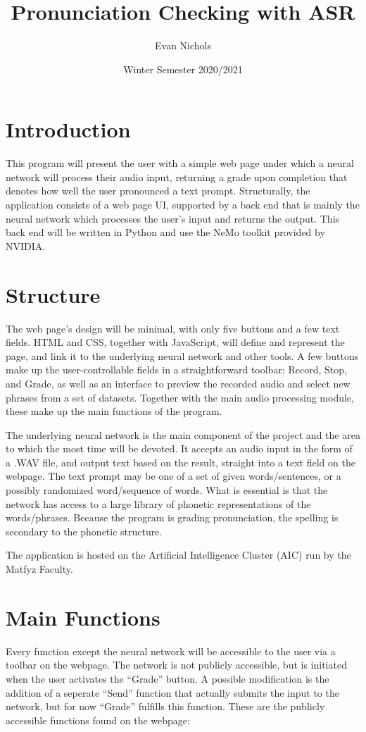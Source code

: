 \documentclass[12pt, letterpaper]{article}
\title{Pronunciation Checking with ASR}
\author{Evan Nichols}
\date{Winter Semester 2020/2021}
\begin{document}
\maketitle
\section*{Introduction}
This program will present the user with a simple web page under which a neural network will process their audio input, returning a grade upon completion that denotes how well the user pronounced a text prompt. Structurally, the application consists of a web page UI, supported by a back end that is mainly the neural network which processes the user’s input and returns the output. This back end will be written in Python and use the NeMo toolkit provided by NVIDIA.


\section*{Structure}
The web page’s design will be minimal, with only five buttons and a few text fields. HTML and CSS, together with JavaScript, will define and represent the page, and link it to the underlying neural network and other tools. A few buttons make up the user-controllable fields in a straightforward toolbar: Record, Stop, and Grade, as well as an interface to preview the recorded audio and select new phrases from a set of datasets. Together with the main audio processing module, these make up the main functions of the program.

The underlying neural network is the main component of the project and the area to which the most time will be devoted. It accepts an audio input in the form of a .WAV file, and output text based on the result, straight into a text field on the webpage. The text prompt may be one of a set of given words/sentences, or a possibly randomized word/sequence of words. What is essential is that the network has access to a large library of phonetic representations of the words/phrases. Because the program is grading pronunciation, the spelling is secondary to the phonetic structure. 

The application is hosted on the Artificial Intelligence Cluster (AIC) run by the Matfyz Faculty.  


\section*{Main Functions}
Every function except the neural network will be accessible to the user via a toolbar on the webpage. The network is not publicly accessible, but is initiated when the user activates the “Grade” button. A possible modification is the addition of a seperate “Send” function that actually submits the input to the network, but for now “Grade” fulfills this function. These are the publicly accessible functions found on the webpage:
\end{document}
